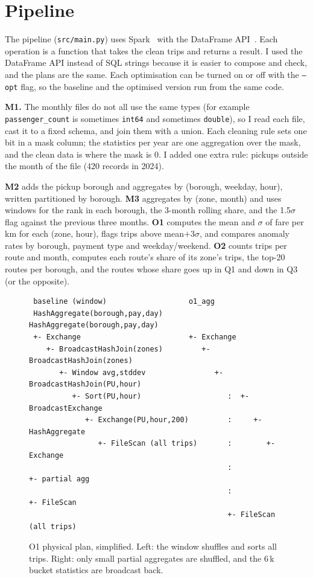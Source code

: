 \documentclass[sigconf]{acmart}
\begin{document}
\section{Pipeline}

The pipeline (\texttt{src/main.py}) uses Spark~\cite{zaharia2012rdd} with the
DataFrame API~\cite{armbrust2015sparksql}. Each operation is a function that
takes the clean trips and returns a result. I used the DataFrame API instead
of SQL strings because it is easier to compose and check, and the plans are
the same. Each optimisation can be turned on or off with the \texttt{--opt}
flag, so the baseline and the optimised version run from the same code.

\textbf{M1.} The monthly files do not all use the same types (for example
\texttt{passenger\_count} is sometimes \texttt{int64} and sometimes
\texttt{double}), so I read each file, cast it to a fixed schema, and join
them with a union. Each cleaning rule sets one bit in a mask column; the
statistics per year are one aggregation over the mask, and the clean data is
where the mask is 0. I added one extra rule: pickups outside the month of the
file (420 records in 2024).

\textbf{M2} adds the pickup borough and aggregates by (borough, weekday,
hour), written partitioned by borough. \textbf{M3} aggregates by (zone, month)
and uses windows for the rank in each borough, the 3-month rolling share, and
the 1.5$\sigma$ flag against the previous three months. \textbf{O1} computes
the mean and $\sigma$ of fare per km for each (zone, hour), flags trips above
mean$+3\sigma$, and compares anomaly rates by borough, payment type and
weekday/weekend. \textbf{O2} counts trips per route and month, computes each
route's share of its zone's trips, the top-20 routes per borough, and the
routes whose share goes up in Q1 and down in Q3 (or the opposite).

\begin{figure}[t]
\scriptsize
\begin{verbatim}
 baseline (window)                   o1_agg
 HashAggregate(borough,pay,day)      HashAggregate(borough,pay,day)
 +- Exchange                         +- Exchange
    +- BroadcastHashJoin(zones)         +- BroadcastHashJoin(zones)
       +- Window avg,stddev                +- BroadcastHashJoin(PU,hour)
          +- Sort(PU,hour)                    :  +- BroadcastExchange
             +- Exchange(PU,hour,200)         :     +- HashAggregate
                +- FileScan (all trips)       :        +- Exchange
                                              :           +- partial agg
                                              :              +- FileScan
                                              +- FileScan (all trips)
\end{verbatim}
\caption{O1 physical plan, simplified. Left: the window shuffles and sorts all
trips. Right: only small partial aggregates are shuffled, and the 6\,k bucket
statistics are broadcast back.}
\label{fig:plan}
\end{figure}
\end{document}
